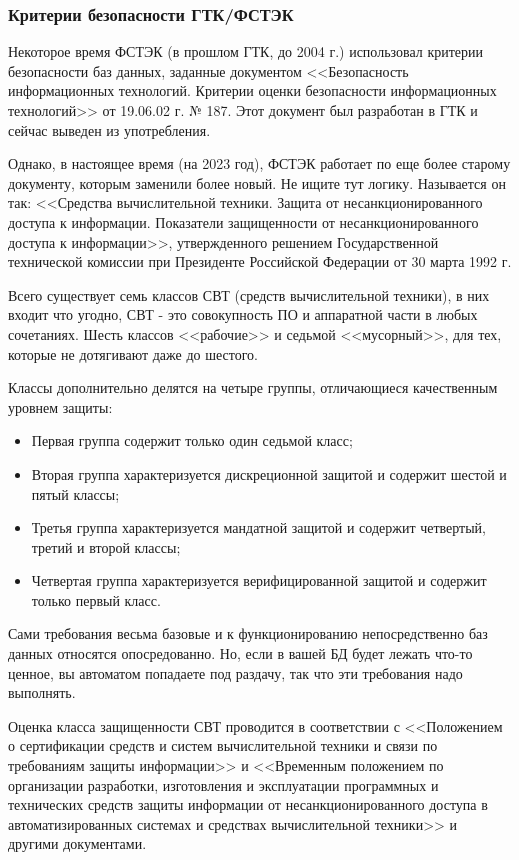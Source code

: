 \subsubsection{Критерии безопасности ГТК/ФСТЭК}

Некоторое время ФСТЭК (в прошлом ГТК, до 2004 г.) использовал критерии безопасности баз данных, заданные документом <<Безопасность информационных технологий. Критерии оценки безопасности информационных технологий>> от 19.06.02 г. № 187. Этот документ был разработан в ГТК и сейчас выведен из употребления. \cite{GTK187}

Однако, в настоящее время (на 2023 год), ФСТЭК работает по еще более старому документу, которым заменили более новый. Не ищите тут логику. Называется он так:
<<Средства вычислительной техники. Защита от несанкционированного доступа к информации. Показатели защищенности от несанкционированного доступа к информации>>, утвержденного решением Государственной технической комиссии при Президенте Российской Федерации от 30 марта 1992 г. \cite{GTK_1992}

Всего существует семь классов СВТ (средств вычислительной техники), в них входит что угодно, СВТ - это совокупность ПО и аппаратной части в любых сочетаниях. Шесть классов <<рабочие>> и седьмой <<мусорный>>, для тех, которые не дотягивают даже до шестого.

Классы дополнительно делятся на четыре группы, отличающиеся качественным уровнем защиты:
\begin{itemize}
	\item Первая группа содержит только один седьмой класс;
	\item Вторая группа характеризуется дискреционной защитой и содержит шестой и пятый классы;
	\item Третья группа характеризуется мандатной защитой и содержит четвертый, третий и второй классы;
	\item Четвертая группа характеризуется верифицированной защитой и содержит только первый класс.
\end{itemize}

Сами требования весьма базовые и к функционированию непосредственно баз данных относятся опосредованно. Но, если в вашей БД будет лежать что-то ценное, вы автоматом попадаете под раздачу, так что эти требования надо выполнять.

Оценка класса защищенности СВТ проводится в соответствии с
<<Положением о сертификации средств и систем вычислительной техники и связи по требованиям защиты информации>> и <<Временным положением по организации разработки, изготовления и эксплуатации программных и технических средств защиты информации от несанкционированного доступа в автоматизированных системах и средствах вычислительной техники>> и другими документами.

